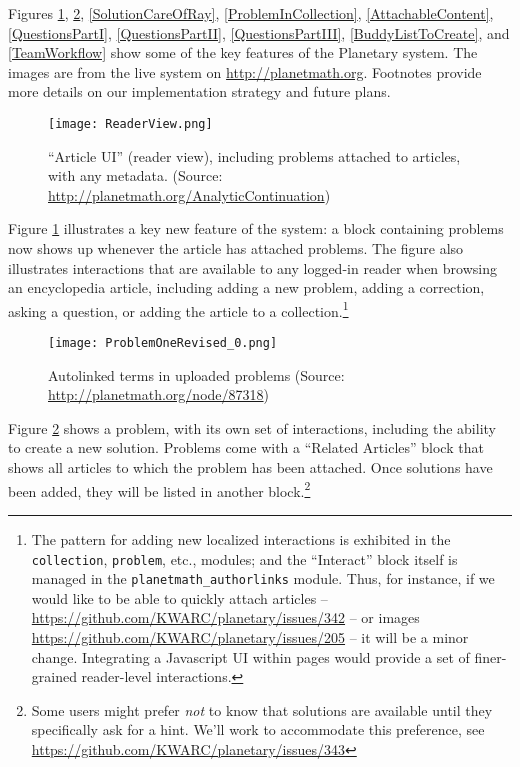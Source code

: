 \documentclass[12pt]{article}
\begin{document}
Figures \ref{ReaderView}, \ref{ProblemOne}, \ref{SolutionCareOfRay}, \ref{ProblemInCollection}, \ref{AttachableContent}, \ref{QuestionsPartI}, \ref{QuestionsPartII}, \ref{QuestionsPartIII}, \ref{BuddyListToCreate}, and \ref{TeamWorkflow} show some of the key features of the Planetary system.  The images are from the live system on \url{http://planetmath.org}. Footnotes provide more details on our implementation strategy and future plans.

\begin{figure}[h]
\begin{center}
\texttt{[image: ReaderView.png]}
\end{center}
\caption{``Article UI'' (reader view), including problems attached to
  articles, with any metadata. (Source: \url{http://planetmath.org/AnalyticContinuation})\label{ReaderView}}
\end{figure}

Figure \ref{ReaderView} illustrates a key new feature of the system: a block containing problems now shows up whenever the article has attached problems.  The figure also illustrates interactions that are available to any logged-in reader when browsing an encyclopedia article, including adding a new problem, adding a correction, asking a question, or adding the article to a collection.\footnote{The pattern for adding new localized interactions is exhibited in the {\tt collection}, {\tt problem}, etc., modules; and the ``Interact'' block itself is managed in the {\tt planetmath\_authorlinks} module. Thus, for instance, if we would like to be able to quickly attach articles -- \url{https://github.com/KWARC/planetary/issues/342} -- or images \url{https://github.com/KWARC/planetary/issues/205} -- it will be a minor change.  Integrating a Javascript UI within pages would provide a set of finer-grained reader-level interactions.}


\begin{figure}[h]
\begin{center}
\texttt{[image: ProblemOneRevised\_0.png]}
\end{center}
\caption{Autolinked terms in uploaded problems (Source: \url{http://planetmath.org/node/87318}) \label{ProblemOne}}
\end{figure}

Figure \ref{ProblemOne} shows a problem, with its own set of interactions, including the ability to create a new solution.  Problems come with a ``Related Articles'' block that shows all articles to which the problem has been attached.  Once solutions have been added, they will be listed in another block.\footnote{Some users might prefer \emph{not} to know that solutions are available until they specifically ask for a hint.  We'll work to accommodate this preference, see
\url{https://github.com/KWARC/planetary/issues/343}}
\end{document}
